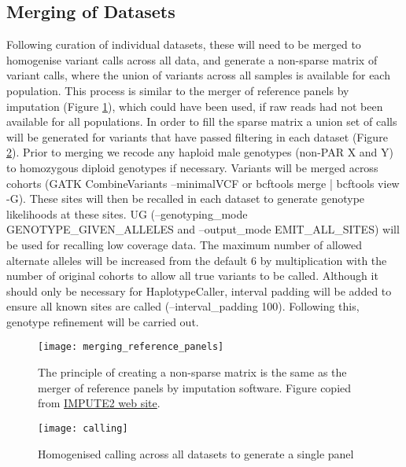 \subsection{Merging of Datasets}
Following curation of individual datasets, these will need to be merged to homogenise variant calls across all data, and generate a non-sparse matrix of variant calls, where the union of variants across all samples is available for each population. This process is similar to the merger of reference panels by imputation (Figure \ref{fig:merging_reference_panels}), which could have been used, if raw reads had not been available for all populations. In order to fill the sparse matrix a union set of calls will be generated for variants that have passed filtering in each dataset (Figure \ref{fig:calling}). Prior to merging we recode any haploid male genotypes (non-PAR X and Y) to homozygous diploid genotypes if necessary. %
Variants will be merged across cohorts (GATK CombineVariants --minimalVCF or bcftools merge | bcftools view -G). These sites will then be recalled in each dataset to generate genotype likelihoods at these sites.
UG (--genotyping\_mode GENOTYPE\_GIVEN\_ALLELES and --output\_mode EMIT\_ALL\_SITES) will be used for recalling low coverage data.
The maximum number of allowed alternate alleles will be increased from the default 6 by multiplication with the number of original cohorts to allow all true variants to be called. Although it should only be necessary for HaplotypeCaller, interval padding will be added to ensure all known sites are called (--interval\_padding 100).
Following this, genotype refinement will be carried out.

\begin{figure}[h]
\centering
\texttt{[image: merging\_reference\_panels]}
\caption{The principle of creating a non-sparse matrix is the same as the merger of reference panels by imputation software. Figure copied from \href{http://mathgen.stats.ox.ac.uk/impute/merging\_reference\_panels.png}{IMPUTE2 web site}.}
\label{fig:merging_reference_panels}
\end{figure}

\begin{figure}[h]
\centering
\texttt{[image: calling]}
\caption{Homogenised calling across all datasets to generate a single panel}
\label{fig:calling}
\end{figure}
